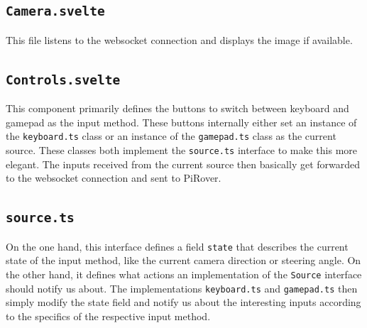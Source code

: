 \subsection*{\texttt{Camera.svelte}}

This file listens to the websocket connection and displays the image if available.

\subsection*{\texttt{Controls.svelte}}

This component primarily defines the buttons to switch between keyboard and gamepad as the input method. These buttons internally either set an instance of the \texttt{keyboard.ts} class or an instance of the \texttt{gamepad.ts} class as the current source. These classes both implement the \texttt{source.ts} interface to make this more elegant. The inputs received from the current source then basically get forwarded to the websocket connection and sent to PiRover.

\subsection*{\texttt{source.ts}}

On the one hand, this interface defines a field \texttt{state} that describes the current state of the input method, like the current camera direction or steering angle. On the other hand, it defines what actions an implementation of the \texttt{Source} interface should notify us about. The implementations \texttt{keyboard.ts} and \texttt{gamepad.ts}  then simply modify the state field and notify us about the interesting inputs according to the specifics of the respective input method.

